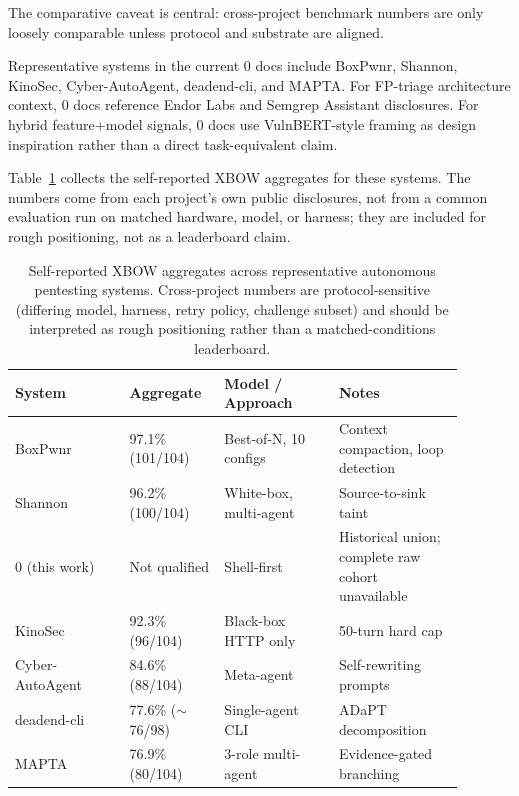 \documentclass[11pt]{article}
\begin{document}
The comparative caveat is central: cross-project benchmark numbers are only
loosely comparable unless protocol and substrate are aligned.

Representative systems in the current 0 docs include BoxPwnr, Shannon,
KinoSec, Cyber-AutoAgent, deadend-cli, and
MAPTA\citep{boxpwnr,shannon,kinosec,cyberautoagent,deadend,mapta}.
For FP-triage architecture context, 0 docs reference Endor Labs and
Semgrep Assistant disclosures\citep{endor,semgrep}. For hybrid feature+model
signals, 0 docs use VulnBERT-style framing as design inspiration rather
than a direct task-equivalent claim\citep{vulnbert}.

Table~\ref{tab:competitors} collects the self-reported XBOW aggregates for
these systems. The numbers come from each project's own public disclosures,
not from a common evaluation run on matched hardware, model, or harness; they
are included for rough positioning, not as a leaderboard claim.

\begin{table}[ht]
\centering
\small
\begin{tabular}{p{0.23\linewidth}p{0.18\linewidth}p{0.23\linewidth}p{0.25\linewidth}}
\toprule
System & Aggregate & Model / Approach & Notes \\
\midrule
BoxPwnr\citep{boxpwnr}             & 97.1\% (101/104) & Best-of-N, 10 configs  & Context compaction, loop detection \\
Shannon\citep{shannon}              & 96.2\% (100/104) & White-box, multi-agent & Source-to-sink taint \\
0 (this work) & Not qualified & Shell-first & Historical union; complete raw cohort unavailable \\
KinoSec\citep{kinosec}              & 92.3\% (96/104)  & Black-box HTTP only    & 50-turn hard cap \\
Cyber-AutoAgent\citep{cyberautoagent} & 84.6\% (88/104)  & Meta-agent             & Self-rewriting prompts \\
deadend-cli\citep{deadend}          & 77.6\% ($\sim$76/98) & Single-agent CLI     & ADaPT decomposition \\
MAPTA\citep{mapta}                  & 76.9\% (80/104)  & 3-role multi-agent     & Evidence-gated branching \\
\bottomrule
\end{tabular}
\caption{Self-reported XBOW aggregates across representative autonomous pentesting systems. Cross-project numbers are protocol-sensitive (differing model, harness, retry policy, challenge subset) and should be interpreted as rough positioning rather than a matched-conditions leaderboard.}
\label{tab:competitors}
\end{table}
\end{document}
